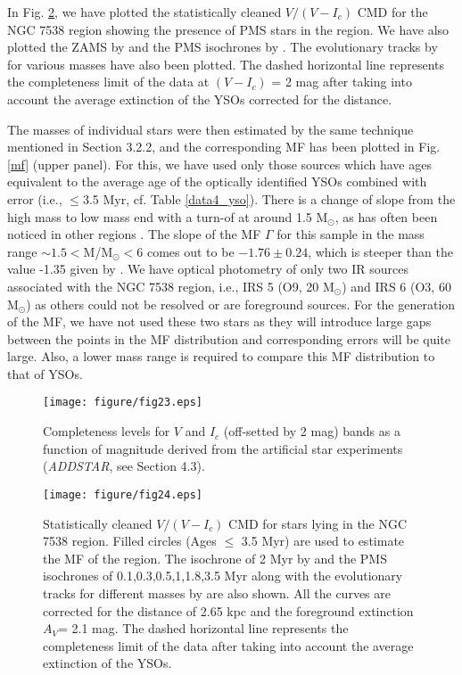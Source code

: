\documentclass[a4paper,fleqn,usenatbib,useAMS]{mnras}
\begin{document}
In Fig. \ref{cleaned}, we have plotted the statistically cleaned $V/(V-I_c)$ CMD for the NGC 7538 region showing
 the presence of PMS stars in the region.
We have also plotted the ZAMS by \citet{2000AA...358..593S} and  the PMS isochrones by \citet{2000AA...358..593S}.  
The evolutionary tracks by \citet{2000AA...358..593S} for various masses have also been plotted.
The dashed horizontal line represents the completeness limit of the data at $(V-I_c)$ = 2 mag
 after taking into account the average extinction of the YSOs corrected for the distance.


The masses of individual stars were then estimated by the same technique mentioned in 
Section 3.2.2, and the corresponding MF has been plotted in Fig. \ref{mf} (upper panel). 
For this, we have used only those sources which have ages equivalent to the average age 
of the optically identified YSOs combined with error (i.e., $\leq$3.5 Myr, cf. Table \ref{data4_yso}).
There is a change of slope from the high mass to low mass end  with a turn-of
at around 1.5 M$_\odot$, as has often been noticed in other regions
\citep{2007MNRAS.380.1141S, 2008MNRAS.383.1241P, 2008MNRAS.384.1675J}.
The slope of the MF $\Gamma$ for this sample in the mass range $\sim1.5<$M/M$_\odot < 6$ comes out to be $-1.76\pm0.24$,
which is steeper than the value -1.35 given by \citet{1955ApJ...121..161S}.
We have optical photometry of only two IR sources associated with the NGC 7538 region,
i.e., IRS 5 (O9, 20 M$_\odot$) and IRS 6 (O3, 60 M$_\odot$) 
as others could not be resolved or are foreground sources. 
For the generation of the MF, we have not used these two stars as they will introduce 
large gaps between the points in the MF distribution and corresponding  errors will be quite large.
Also, a lower mass range is required to compare this MF distribution to that of YSOs.


\begin{figure}
\centering\texttt{[image: figure/fig23.eps]}
\caption{\label{cft} Completeness levels for $V$ and $I_c$ (off-setted by 2 mag) bands as a function of magnitude
derived from the artificial star experiments ({\it ADDSTAR}, see Section 4.3).}
\end{figure}

\begin{figure}
\centering
\texttt{[image: figure/fig24.eps]}
\caption{\label{cleaned} Statistically cleaned $V/(V-I_c)$ CMD  for stars lying in the NGC 7538 region.
Filled circles (Ages $\leq$ 3.5 Myr) are used to estimate the MF of the region.
The isochrone of 2 Myr by \citet{2008AA...482..883M} and the PMS isochrones
of 0.1,0.3,0.5,1,1.8,3.5 Myr along with the evolutionary tracks for different masses by \citet{2000AA...358..593S} are also shown. 
All the curves are corrected for the  distance of 2.65 kpc and the foreground extinction $A_V$= 2.1 mag.
The dashed horizontal line represents the completeness limit of the data after taking into account the average extinction of the YSOs.}
\end{figure}
\end{document}
